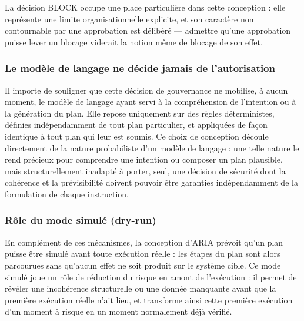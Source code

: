 La décision BLOCK occupe une place particulière dans cette conception : elle représente une limite organisationnelle explicite, et son caractère non contournable par une approbation est délibéré — admettre qu'une approbation puisse lever un blocage viderait la notion même de blocage de son effet.

\subsubsection{Le modèle de langage ne décide jamais de l'autorisation}

Il importe de souligner que cette décision de gouvernance ne mobilise, à aucun moment, le modèle de langage ayant servi à la compréhension de l'intention ou à la génération du plan. Elle repose uniquement sur des règles déterministes, définies indépendamment de tout plan particulier, et appliquées de façon identique à tout plan qui leur est soumis. Ce choix de conception découle directement de la nature probabiliste d'un modèle de langage : une telle nature le rend précieux pour comprendre une intention ou composer un plan plausible, mais structurellement inadapté à porter, seul, une décision de sécurité dont la cohérence et la prévisibilité doivent pouvoir être garanties indépendamment de la formulation de chaque instruction.

\subsubsection{Rôle du mode simulé (dry-run)}

En complément de ces mécanismes, la conception d'ARIA prévoit qu'un plan puisse être simulé avant toute exécution réelle : les étapes du plan sont alors parcourues sans qu'aucun effet ne soit produit sur le système cible. Ce mode simulé joue un rôle de réduction du risque en amont de l'exécution : il permet de révéler une incohérence structurelle ou une donnée manquante avant que la première exécution réelle n'ait lieu, et transforme ainsi cette première exécution d'un moment à risque en un moment normalement déjà vérifié.

